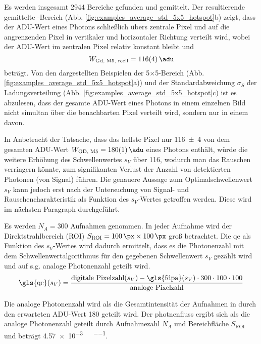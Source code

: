 \noindent
Es werden insgesamt 2944 Bereiche gefunden und gemittelt. Der resultierende gemittelte -Bereich (Abb. \ref{fig:examples_average_std_5x5_hotspot}b) zeigt, dass der ADU-Wert eines Photons schließlich übers zentrale Pixel und auf die angrenzenden Pixel in vertikaler und horizontaler Richtung verteilt wird, wobei der ADU-Wert im zentralen Pixel relativ konstant bleibt und 
\begin{equation}
    W_\text{Gd, M5, reell}  = \SI{116(4)}{\adu} 
\end{equation}
beträgt. Von den dargestellten Beispielen der 5$\times$\SI{5}{\px}-Bereich (Abb. \ref{fig:examples_average_std_5x5_hotspot}a)) und der Standardabweichung $\sigma_{S}$ der Ladungsverteilung (Abb. \ref{fig:examples_average_std_5x5_hotspot}c) ist es abzulesen, dass der gesamte ADU-Wert eines Photons in einem einzelnen Bild nicht simultan über die benachbarten Pixel verteilt wird, sondern nur in einem davon. 

\noindent
In Anbetracht der Tatsache, dass das hellste Pixel nur \SI{116(4)}{\adu} von dem gesamten ADU-Wert $W_\text{GD, M5} = \SI{180(1)}{\adu}$ eines Photons enthält, würde die weitere Erhöhung des Schwellenwertes $s_V$ über \SI{116}{\adu}, wodurch man das Rauschen verringern könnte, zum signifikanten Verlust der Anzahl von detektierten Photonen (von Signal) führen. Die genauere Aussage zum Optimalschwellenwert $s_V$ kann jedoch erst nach der Untersuchung von Signal- und Rauschencharakteristik als Funktion des $s_V$-Wertes getroffen werden. Diese wird im nächsten Paragraph durchgeführt. 

\noindent
Es werden $N_A = 300$ Aufnahmen genommen. In jeder Aufnahme wird der Direktstrahlbereich (ROI) $S_\text{ROI} = \qtyproduct{100 x 100}{\px}$ groß betrachtet. Die \gls{qe} als Funktion des $s_V$-Wertes wird dadurch ermittelt, dass es die Photonenzahl mit dem Schwellenwertalgorithmus für den gegebenen Schwellenwert $s_V$ gezählt wird und auf s.g. analoge Photonenzahl geteilt wird.
\begin{equation}
    \text{\gls{qe}}(s_V) =  \frac{\text{digitale Pixelzahl}(s_V) - \text{\gls{fdpa}}(s_V)\cdot 300\cdot100\cdot 100  }{\text{analoge Pixelzahl}}
\end{equation}



Die analoge Photonenzahl wird als die Gesamtintensität der Aufnahmen in \si{\adu} durch den erwarteten ADU-Wert \SI{180}{\adu} geteilt wird. Der \gls{photnenfluss} ergibt sich als die analoge Photonenzahl geteilt durch Aufnahmezahl $N_A$ und Bereichfläche $S_\text{ROI}$ und beträgt \SI{4.57e-3}{\photons\per\pixel\per\capture}.

